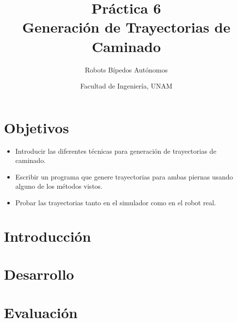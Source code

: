 \documentclass[letterpaper,12pt]{article}
\title{Práctica 6 \\ Generación de Trayectorias de Caminado}
\author{Robots Bípedos Autónomos}
\date{Facultad de Ingeniería, UNAM}
\begin{document}
\renewcommand{\tablename}{Tabla}
\maketitle
\section*{Objetivos}
\begin{itemize}
\item Introducir las diferentes técnicas para generación de trayectorias de caminado.
\item Escribir un programa que genere trayectorias para ambas piernas usando alguno de los métodos vistos.
\item Probar las trayectorias tanto en el simulador como en el robot real.  
\end{itemize}

\section{Introducción}

\section{Desarrollo}

\section{Evaluación}
\end{document}
